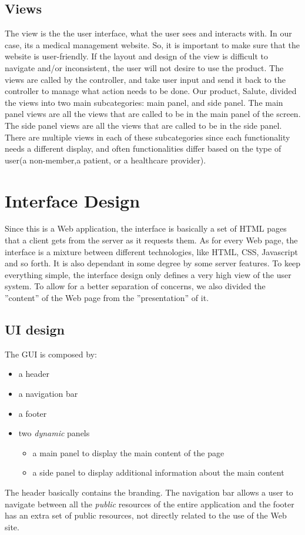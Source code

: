 \documentclass[12pt]{report}
\begin{document}
\subsection{Views}
The view is the the user interface, what the user sees and interacts with. In our case, its a medical management website. So, it is important to make sure that the website is user-friendly. If the layout and design of the view is difficult to navigate and/or inconsistent, the user will not desire to use the product. The views are called by the controller, and take user input and send it back to the controller to manage what action needs to be done. 
Our product, Salute, divided the views into two main subcategories: main panel, and side panel. The main panel views are all the views that are called to be in the main panel of the screen. The side panel views are all the views that are called to be in the side panel. There are multiple views in each of these subcategories since each functionality needs a different display, and often functionalities differ based on the type of user(a non-member,a patient, or a healthcare provider). 

\section{Interface Design}
Since this is a Web application, the interface is basically a set of HTML pages that a client gets from the server as it requests them. As for every Web page, the interface is a mixture between different technologies, like HTML, CSS, Javascript and so forth. It is also dependant in some degree by some server features. To keep everything simple, the interface design only defines a very high view of the user system. To allow for a better separation of concerns, we also divided the ''content'' of the Web page from the ''presentation'' of it.
\subsection{UI design}
The GUI is composed by:
\begin{itemize}
\item a header
\item a navigation bar
\item a footer
\item two \emph{dynamic} panels
	\begin{itemize}
	\item a main panel to display the main content of the page
    \item a side panel to display additional information about the main content
	\end{itemize}
\end{itemize}
The header basically contains the branding. The navigation bar allows a user to navigate between all the \emph{public} resources of the entire application and the footer has an extra set of public resources, not directly related to the use of the Web site.
\end{document}
